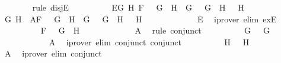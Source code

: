 \begin{isabellebody}
\ \ \ \ \ \ \isamarkupfalse%
\ {\isacharparenleft}rule\ disjE{\isacharparenright}\isanewline
\ \ \ \ \ \ \ \ \isamarkupfalse%
\ E{}{\isacharcolon}{\isachardoublequoteopen}{\isasymexists}G{}\ H{}{\isachardot}\ F\ {\isacharequal}\ \isactrlbold {\isasymnot}\ {\isacharparenleft}G{}\ \isactrlbold {\isasymand}\ H{}{\isacharparenright}\ {\isasymand}\ G\ {\isacharequal}\ \isactrlbold {\isasymnot}\ G{}\ {\isasymand}\ H\ {\isacharequal}\ \isactrlbold {\isasymnot}\ H{}{\isachardoublequoteclose}\isanewline
\ \ \ \ \ \ \ \ \isamarkupfalse%
\ G{}\ H{}\ \ A{}{\isacharcolon}{\isachardoublequoteopen}F\ {\isacharequal}\ \isactrlbold {\isasymnot}\ {\isacharparenleft}G{}\ \isactrlbold {\isasymand}\ H{}{\isacharparenright}\ {\isasymand}\ G\ {\isacharequal}\ \isactrlbold {\isasymnot}\ G{}\ {\isasymand}\ H\ {\isacharequal}\ \isactrlbold {\isasymnot}\ H{}{\isachardoublequoteclose}\ \isanewline
\ \ \ \ \ \ \ \ \ \ \isamarkupfalse%
\ E{}\ \isamarkupfalse%
\ {\isacharparenleft}iprover\ elim{\isacharcolon}\ exE{\isacharparenright}\isanewline
\ \ \ \ \ \ \ \ \isamarkupfalse%
\ {\isachardoublequoteopen}F\ {\isacharequal}\ \isactrlbold {\isasymnot}\ {\isacharparenleft}G{}\ \isactrlbold {\isasymand}\ H{}{\isacharparenright}{\isachardoublequoteclose}\ \isanewline
\ \ \ \ \ \ \ \ \ \ \isamarkupfalse%
\ A{}\ \isamarkupfalse%
\ {\isacharparenleft}rule\ conjunct{}{\isacharparenright}\isanewline
\ \ \ \ \ \ \ \ \isamarkupfalse%
\ {\isachardoublequoteopen}G\ {\isacharequal}\ \isactrlbold {\isasymnot}\ G{}{\isachardoublequoteclose}\isanewline
\ \ \ \ \ \ \ \ \ \ \isamarkupfalse%
\ A{}\ \isamarkupfalse%
\ {\isacharparenleft}iprover\ elim{\isacharcolon}\ conjunct{}\ conjunct{}{\isacharparenright}\isanewline
\ \ \ \ \ \ \ \ \isamarkupfalse%
\ {\isachardoublequoteopen}H\ {\isacharequal}\ \isactrlbold {\isasymnot}\ H{}{\isachardoublequoteclose}\isanewline
\ \ \ \ \ \ \ \ \ \ \isamarkupfalse%
\ A{}\ \isamarkupfalse%
\ {\isacharparenleft}iprover\ elim{\isacharcolon}\ conjunct{}{\isacharparenright}\isanewline
\ \ \ \ \ \ \ \ \isamarkupfalse%

\end{isabellebody}
